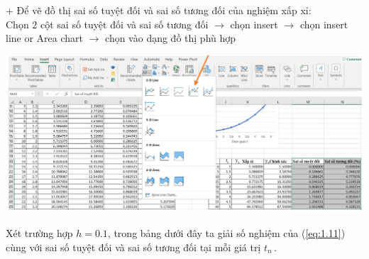 + Để vẽ đồ thị sai số tuyệt đối và sai số tương đối của nghiệm xấp xỉ:\\
Chọn $2$ cột sai số tuyệt đối và sai số tương đối $\rightarrow$ chọn insert $\rightarrow$ chọn insert line or Area chart $\rightarrow$ chọn vào dạng đồ thị phù hợp
\begin{center}
	\includegraphics[scale=0.65]{Images/cac_tham_so_trong_vidu_1_4_1t8}
\end{center}
Xét trường hợp $h = 0.1$, trong bảng dưới đây ta giải số nghiệm của (\ref{eq:1.11}) cùng với sai số tuyệt đối và sai số tương đối tại mỗi giá trị ${{t}_{n}}\,$.
